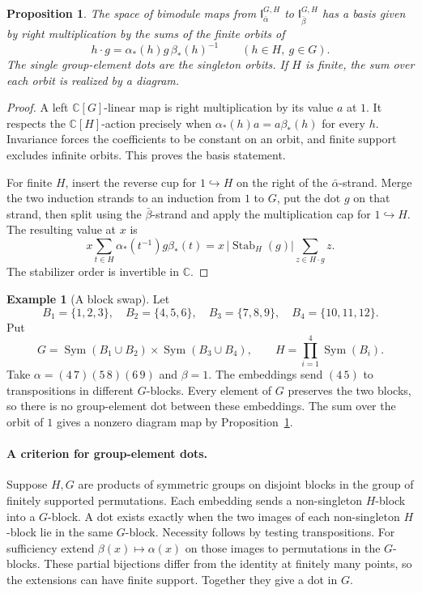 \documentclass[11pt,a4paper]{article}
\numberwithin{equation}{section}
\newtheorem{proposition}[theorem]{Proposition}
\theoremstyle{definition}
\newtheorem{example}{Example}[section]
\newcommand{\C}{\mathbb C}
\newcommand{\I}{\mathsf I}
\begin{document}
\begin{proposition}\label{prop:orbit-hom}
The space of bimodule maps from \(\I_{\bar\alpha}^{G,H}\) to
\(\I_{\bar\beta}^{G,H}\) has a basis given by right multiplication
by the sums of the finite orbits of
\[
       h\cdot g=\alpha_*(h)g\,\beta_*(h)^{-1}
       \qquad(h\in H,\ g\in G).
\]
The single group-element dots are the singleton orbits. If \(H\) is
finite, the sum over each orbit is realized by a diagram.
\end{proposition}
\begin{proof}
A left \(\C[G]\)-linear map is right multiplication by its value \(a\)
at \(1\). It respects the \(\C[H]\)-action precisely when
\(\alpha_*(h)a=a\beta_*(h)\) for every \(h\). Invariance forces the
coefficients to be constant on an orbit, and finite support excludes
infinite orbits. This proves the basis statement.

For finite \(H\), insert the reverse cup for \(1\hookrightarrow H\)
on the right of the \(\bar\alpha\)-strand. Merge the two induction
strands to an induction from \(1\) to \(G\), put the dot \(g\) on
that strand, then split using the \(\bar\beta\)-strand and apply the
multiplication cap for \(1\hookrightarrow H\). The resulting value
at \(x\) is
\[
 x\sum_{t\in H}\alpha_*(t^{-1})g\beta_*(t)
   =x\,|\operatorname{Stab}_H(g)|\sum_{z\in H\cdot g}z .
\]
The stabilizer order is invertible in \(\C\).
\end{proof}


\begin{example}[A block swap]\label{ex:block-swap}
Let
\[
 B_1=\{1,2,3\},\quad B_2=\{4,5,6\},\quad
 B_3=\{7,8,9\},\quad B_4=\{10,11,12\}.
\]
Put
\[
 G=\operatorname{Sym}(B_1\cup B_2)\times\operatorname{Sym}(B_3\cup B_4),
 \qquad H=\prod_{i=1}^4\operatorname{Sym}(B_i).
\]
Take \(\alpha=(4\,7)(5\,8)(6\,9)\) and \(\beta=1\).
The embeddings send \((4\,5)\) to transpositions in different
\(G\)-blocks. Every element of \(G\) preserves the two blocks,
so there is no group-element dot between these embeddings.
The sum over the orbit of \(1\) gives a nonzero diagram map by
Proposition~\ref{prop:orbit-hom}.
\end{example}

\paragraph{A criterion for group-element dots.}
Suppose \(H,G\) are products of symmetric groups on disjoint
blocks in the group of finitely supported permutations. Each
embedding sends a non-singleton \(H\)-block into a \(G\)-block.
A dot exists exactly when the two images of each non-singleton
\(H\)-block lie in the same \(G\)-block. Necessity follows by
testing transpositions. For sufficiency extend
\(\beta(x)\mapsto\alpha(x)\) on those images to permutations in
the \(G\)-blocks. These partial bijections differ from the
identity at finitely many points, so the extensions can have
finite support. Together they give a dot in \(G\).
\end{document}
